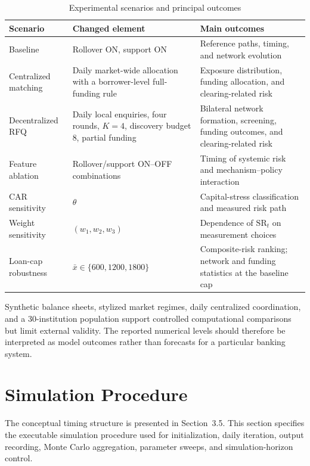\begin{table}[htbp]
\centering
\caption{Experimental scenarios and principal outcomes}
\label{tab:experimental-scenarios}
\small
\renewcommand{\arraystretch}{1.16}
\begin{tabularx}{\textwidth}{@{}>{\raggedright\arraybackslash}p{}>{\raggedright\arraybackslash}p{}X@{}}
\toprule
\textbf{Scenario} & \textbf{Changed element} & \textbf{Main outcomes}\\
\midrule
Baseline & Rollover ON, support ON & Reference paths, timing, and network evolution\\
Centralized matching & Daily market-wide allocation with a borrower-level full-funding rule & Exposure distribution, funding allocation, and clearing-related risk\\
Decentralized RFQ & Daily local enquiries, four rounds, $K=4$, discovery budget 8, partial funding & Bilateral network formation, screening, funding outcomes, and clearing-related risk\\
Feature ablation & Rollover/support ON--OFF combinations & Timing of systemic risk and mechanism--policy interaction\\
CAR sensitivity & $\theta$ & Capital-stress classification and measured risk path\\
Weight sensitivity & $(w_1,w_2,w_3)$ & Dependence of $\mathrm{SR}_t$ on measurement choices\\
Loan-cap robustness & $\bar{x}\in\{600,1200,1800\}$ & Composite-risk ranking; network and funding statistics at the baseline cap\\
\bottomrule
\end{tabularx}
\end{table}

Synthetic balance sheets, stylized market regimes, daily centralized
coordination, and a 30-institution population support
controlled computational comparisons but limit external validity. The
reported numerical levels should therefore be interpreted as model
outcomes rather than forecasts for a particular banking system.

\section{Simulation Procedure}

The conceptual timing structure is presented in Section~3.5. This
section specifies the executable simulation procedure used for
initialization, daily iteration, output recording, Monte Carlo
aggregation, parameter sweeps, and simulation-horizon control.

